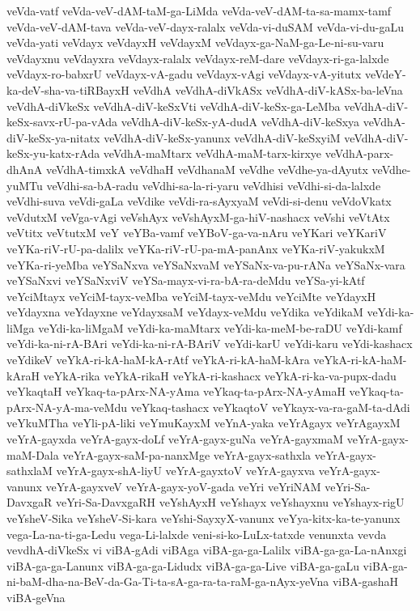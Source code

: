 {veVda-vatf
veVda-veV-dAM-taM-ga-LiMda
veVda-veV-dAM-ta-sa-mamx-tamf
veVda-veV-dAM-tava
veVda-veV-dayx-ralalx
veVda-vi-duSAM
veVda-vi-du-gaLu
veVda-yati
veVdayx
veVdayxH
veVdayxM
veVdayx-ga-NaM-ga-Le-ni-su-varu
veVdayxnu
veVdayxra
veVdayx-ralalx
veVdayx-reM-dare
veVdayx-ri-ga-lalxde
veVdayx-ro-babxrU
veVdayx-vA-gadu
veVdayx-vAgi
veVdayx-vA-yitutx
veVdeY-ka-deV-sha-va-tiRBayxH
veVdhA
veVdhA-diVkASx
veVdhA-diV-kASx-ba-leVna
veVdhA-diVkeSx
veVdhA-diV-keSxVti
veVdhA-diV-keSx-ga-LeMba
veVdhA-diV-keSx-savx-rU-pa-vAda
veVdhA-diV-keSx-yA-dudA
veVdhA-diV-keSxya
veVdhA-diV-keSx-ya-nitatx
veVdhA-diV-keSx-yanunx
veVdhA-diV-keSxyiM
veVdhA-diV-keSx-yu-katx-rAda
veVdhA-maMtarx
veVdhA-maM-tarx-kirxye
veVdhA-parx-dhAnA
veVdhA-timxkA
veVdhaH
veVdhanaM
veVdhe
veVdhe-ya-dAyutx
veVdhe-yuMTu
veVdhi-sa-bA-radu
veVdhi-sa-la-ri-yaru
veVdhisi
veVdhi-si-da-lalxde
veVdhi-suva
veVdi-gaLa
veVdike
veVdi-ra-sAyxyaM
veVdi-si-denu
veVdoVkatx
veVdutxM
veVga-vAgi
veVshAyx
veVshAyxM-ga-hiV-nashacx
veVshi
veVtAtx
veVtitx
veVtutxM
veY
veYBa-vamf
veYBoV-ga-va-nAru
veYKari
veYKariV
veYKa-riV-rU-pa-dalilx
veYKa-riV-rU-pa-mA-panAnx
veYKa-riV-yakukxM
veYKa-ri-yeMba
veYSaNxva
veYSaNxvaM
veYSaNx-va-pu-rANa
veYSaNx-vara
veYSaNxvi
veYSaNxviV
veYSa-mayx-vi-ra-bA-ra-deMdu
veYSa-yi-kAtf
veYciMtayx
veYciM-tayx-veMba
veYciM-tayx-veMdu
veYciMte
veYdayxH
veYdayxna
veYdayxne
veYdayxsaM
veYdayx-veMdu
veYdika
veYdikaM
veYdi-ka-liMga
veYdi-ka-liMgaM
veYdi-ka-maMtarx
veYdi-ka-meM-be-raDU
veYdi-kamf
veYdi-ka-ni-rA-BAri
veYdi-ka-ni-rA-BAriV
veYdi-karU
veYdi-karu
veYdi-kashacx
veYdikeV
veYkA-ri-kA-haM-kA-rAtf
veYkA-ri-kA-haM-kAra
veYkA-ri-kA-haM-kAraH
veYkA-rika
veYkA-rikaH
veYkA-ri-kashacx
veYkA-ri-ka-va-pupx-dadu
veYkaqtaH
veYkaq-ta-pArx-NA-yAma
veYkaq-ta-pArx-NA-yAmaH
veYkaq-ta-pArx-NA-yA-ma-veMdu
veYkaq-tashacx
veYkaqtoV
veYkayx-va-ra-gaM-ta-dAdi
veYkuMTha
veYli-pA-liki
veYmuKayxM
veYnA-yaka
veYrAgayx
veYrAgayxM
veYrA-gayxda
veYrA-gayx-doLf
veYrA-gayx-guNa
veYrA-gayxmaM
veYrA-gayx-maM-Dala
veYrA-gayx-saM-pa-nanxMge
veYrA-gayx-sathxla
veYrA-gayx-sathxlaM
veYrA-gayx-shA-liyU
veYrA-gayxtoV
veYrA-gayxva
veYrA-gayx-vanunx
veYrA-gayxveV
veYrA-gayx-yoV-gada
veYri
veYriNAM
veYri-Sa-DavxgaR
veYri-Sa-DavxgaRH
veYshAyxH
veYshayx
veYshayxnu
veYshayx-rigU
veYsheV-Sika
veYsheV-Si-kara
veYshi-SayxyX-vanunx
veYya-kitx-ka-te-yanunx
vega-La-na-ti-ga-Ledu
vega-Li-lalxde
veni-si-ko-LuLx-tatxde
venunxta
vevda
vevdhA-diVkeSx
vi
viBA-gAdi
viBAga
viBA-ga-ga-Lalilx
viBA-ga-ga-La-nAnxgi
viBA-ga-ga-Lanunx
viBA-ga-ga-Lidudx
viBA-ga-ga-Live
viBA-ga-gaLu
viBA-ga-ni-baM-dha-na-BeV-da-Ga-Ti-ta-sA-ga-ra-ta-raM-ga-nAyx-yeVna
viBA-gashaH
viBA-geVna
}
